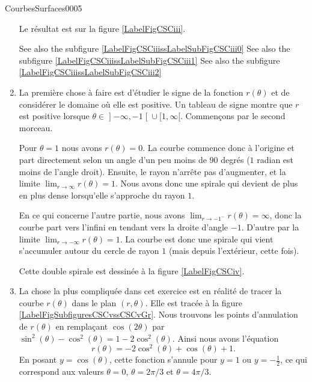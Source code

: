 \begin{corrige}{CourbesSurfaces0005}
\begin{enumerate}
			\newcommand{\CaptionFigCSCiii}{La courbe de l'exercice \ref{exoCourbesSurfaces0005}.\ref{CSCiii}. Les deux premières branches sont dessinées. Notez que la seconde est beaucoup plus petite que la première, et qu'elle part de \( (0,0)\).}

            Le résultat est sur la figure \ref{LabelFigCSCiii}.
            
            See also the subfigure \ref{LabelFigCSCiiissLabelSubFigCSCiii0}
            See also the subfigure \ref{LabelFigCSCiiissLabelSubFigCSCiii1}
            See also the subfigure \ref{LabelFigCSCiiissLabelSubFigCSCiii2}

		\item

			La première chose à faire est d'étudier le signe de la fonction $r(\theta)$ et de considérer le domaine où elle est positive. Un tableau de signe montre que $r$ est positive lorsque $\theta\in\mathopen] -\infty , -1 \mathclose[\cup\mathopen[ 1 , \infty [$. Commençons par le second morceau. 

			Pour $\theta=1$ nous avons $r(\theta)=0$. La courbe commence donc à l'origine et part directement selon un angle d'un peu moins de $90$ degrés ($1$ radian est moins de l'angle droit). Ensuite, le rayon n'arrête pas d'augmenter, et la limite $\lim_{r\to \infty} r(\theta)=1$. Nous avons donc une spirale qui devient de plus en plus dense lorsqu'elle s'approche du rayon $1$.

			En ce qui concerne l'autre partie, nous avons $\lim_{r\to -1^{-}} r(\theta)=\infty$, donc la courbe part vers l'infini en tendant vers la droite d'angle $-1$. D'autre par la limite $\lim_{r\to -\infty} r(\theta)=1$. La courbe est donc une spirale qui vient s'accumuler autour du cercle de rayon $1$ (mais depuis l'extérieur, cette fois).
			
			Cette double spirale est dessinée à la figure \ref{LabelFigCSCiv}.
			\newcommand{\CaptionFigCSCiv}{La courbe de l'exercice \ref{exoCourbesSurfaces0005}.\ref{CSCiv}.}
			

		\item
			\newcommand{\CaptionFigSubfiguresCSCv}{La courbe de l'exercice \ref{exoCourbesSurfaces0005}.\ref{CSCv}.}
			
			La chose la plus compliquée dans cet exercice est en réalité de tracer la courbe $r(\theta)$ dans le plan $(r,\theta)$. Elle est tracée à la figure \ref{LabelFigSubfiguresCSCvssCSCvGr}. Nous trouvons les points d'annulation de $r(\theta)$ en remplaçant $\cos(2\theta)$ par $\sin^2(\theta)-\cos^2(\theta)=1-2\cos^2(\theta)$. Ainsi nous avons l'équation
			\begin{equation}
				r(\theta)=-2\cos^2(\theta)+\cos(\theta)+1.
			\end{equation}
			En posant $y=\cos(\theta)$, cette fonction s'annule pour $y=1$ ou $y=-\frac{ 1 }{2}$, ce qui correspond aux valeurs $\theta=0$, $\theta=2\pi/3$ et $\theta=4\pi/3$.


\end{enumerate}
\end{corrige}
